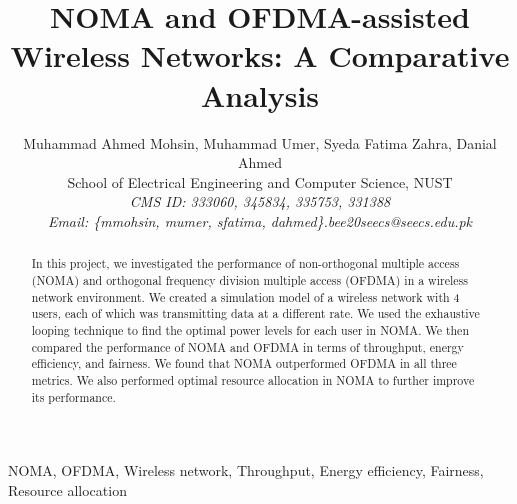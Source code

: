 \documentclass[conference]{IEEEtran}
\begin{document}
\title{NOMA and OFDMA-assisted Wireless Networks: A Comparative Analysis}

\author{Muhammad Ahmed Mohsin, Muhammad Umer, Syeda Fatima Zahra, Danial Ahmed\\
	School of Electrical Engineering and Computer Science, NUST\\
	\textit{CMS ID: 333060, 345834, 335753, 331388}\\
	\textit{Email: \{mmohsin, mumer, sfatima, dahmed\}.bee20seecs@seecs.edu.pk}
}

\maketitle

\begin{abstract}
In this project, we investigated the performance of non-orthogonal multiple access (NOMA) and orthogonal frequency division multiple access (OFDMA) in a wireless network environment. We created a simulation model of a wireless network with 4 users, each of which was transmitting data at a different rate. We used the exhaustive looping technique to find the optimal power levels for each user in NOMA. We then compared the performance of NOMA and OFDMA in terms of throughput, energy efficiency, and fairness. We found that NOMA outperformed OFDMA in all three metrics. We also performed optimal resource allocation in NOMA to further improve its performance.

\end{abstract}

\begin{IEEEkeywords}
NOMA, OFDMA, Wireless network, Throughput, Energy efficiency, Fairness, Resource allocation

\end{IEEEkeywords}
\end{document}
